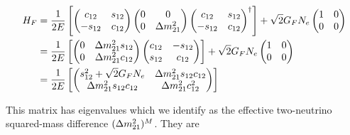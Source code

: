 \begin{align}
    H_F
        &= \frac{1}{2E}\left[
            \begin{pmatrix}
                c_{12} & s_{12} \\ 
                -s_{12} & c_{12} \\ 
            \end{pmatrix}  
            \begin{pmatrix}
            0 & 0 \\
            0 & \dm_{21}
        \end{pmatrix} 
        \begin{pmatrix}
            c_{12} & s_{12}\\ 
            -s_{12} & c_{12} \end{pmatrix}^\dagger \right] + \sqrt{2}G_F N_e 
            \begin{pmatrix}
            1 & 0 \\
            0 & 0 \\
        \end{pmatrix} \nonumber \\
        &= 
        \frac{1}{2E}\left[
            \begin{pmatrix}
                0 & \dm_{21} s_{12} \\ 
                0 & \dm_{21} c_{12} \\ 
            \end{pmatrix}  
        \begin{pmatrix}
            c_{12} & -s_{12}\\ 
            s_{12} & c_{12} \end{pmatrix} \right] + \sqrt{2}G_F N_e 
            \begin{pmatrix}
            1 & 0 \\
            0 & 0 \\
        \end{pmatrix} \nonumber \\
        &= 
        \frac{1}{2E}\left[
            \begin{pmatrix}
                s_{12}^2 + \sqrt{2}G_F N_e & \dm_{21} s_{12}c_{12} \\ 
                \dm_{21} s_{12}c_{12} & \dm_{21} c_{12}^2 \\ 
            \end{pmatrix}  \right]
\end{align}

This matrix has eigenvalues which we identify as the effective two-neutrino squared-mass difference $(\dm[21])^M$. They are 

